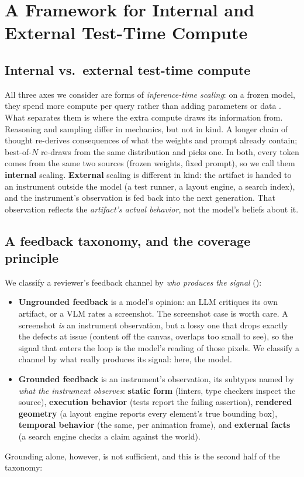 \section{A Framework for Internal and External Test-Time Compute}
\label{sec:framework}

\subsection{Internal vs.\ external test-time compute}
\label{sec:internal-external}

All three axes we consider are forms of \emph{inference-time scaling}: on a frozen model, they spend more compute per query rather than adding parameters or data \citep{openai2024o1,snell2024scaling}. What separates them is where the extra compute draws its information from. Reasoning and sampling differ in mechanics, but not in kind. A longer chain of thought re-derives consequences of what the weights and prompt already contain; best-of-$N$ re-draws from the same distribution and picks one. In both, every token comes from the same two sources (frozen weights, fixed prompt), so we call them \textbf{internal} scaling. \textbf{External} scaling is different in kind: the artifact is handed to an instrument outside the model (a test runner, a layout engine, a search index), and the instrument's observation is fed back into the next generation. That observation reflects the \emph{artifact's actual behavior}, not the model's beliefs about it.

\subsection{A feedback taxonomy, and the coverage principle}
\label{sec:taxonomy}

We classify a reviewer's feedback channel by \emph{who produces the signal} ():
\begin{itemize}[leftmargin=1.4em,itemsep=1pt,topsep=2pt]
\item \textbf{Ungrounded feedback} is a model's opinion: an LLM critiques its own artifact, or a VLM rates a screenshot. The screenshot case is worth care. A screenshot \emph{is} an instrument observation, but a lossy one that drops exactly the defects at issue (content off the canvas, overlaps too small to see), so the signal that enters the loop is the model's reading of those pixels. We classify a channel by what really produces its signal: here, the model.
\item \textbf{Grounded feedback} is an instrument's observation, its subtypes named by \emph{what the instrument observes}: \textbf{static form} (linters, type checkers inspect the source), \textbf{execution behavior} (tests report the failing assertion), \textbf{rendered geometry} (a layout engine reports every element's true bounding box), \textbf{temporal behavior} (the same, per animation frame), and \textbf{external facts} (a search engine checks a claim against the world).
\end{itemize}
Grounding alone, however, is not sufficient, and this is the second half of the taxonomy:

